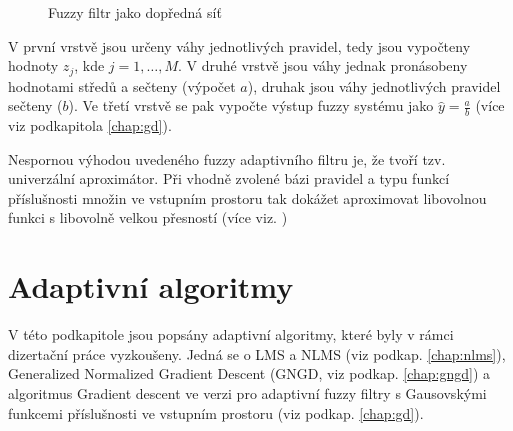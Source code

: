 \begin{figure}[t]
    \caption{Fuzzy filtr jako dopředná síť}
    \label{img:fuzzy_network}
\end{figure}

V první vrstvě jsou určeny váhy jednotlivých pravidel, tedy jsou vypočteny hodnoty $z_j$, kde $j=1,\dots, M$. V druhé vrstvě jsou váhy jednak pronásobeny hodnotami středů a sečteny (výpočet $a$), druhak jsou váhy jednotlivých pravidel sečteny ($b$). Ve třetí vrstvě se pak vypočte výstup fuzzy systému jako $\hat{y}=\frac{a}{b}$ (více viz podkapitola \ref{chap:gd}). 
\par Nespornou výhodou uvedeného fuzzy adaptivního filtru je, že tvoří tzv. univerzální aproximátor. Při vhodně zvolené bázi pravidel a typu funkcí příslušnosti množin ve vstupním prostoru tak dokážet aproximovat libovolnou funkci s libovolně velkou přesností (více viz. \cite{latexcompanion})


\section{Adaptivní algoritmy}\label{chap:aa}
V této podkapitole jsou popsány adaptivní algoritmy, které byly v rámci dizertační práce vyzkoušeny. Jedná se o LMS a NLMS (viz podkap. \ref{chap:nlms}), Generalized Normalized Gradient Descent (GNGD, viz podkap. \ref{chap:gngd}) a algoritmus Gradient descent ve verzi pro adaptivní fuzzy filtry s Gausovskými funkcemi příslušnosti ve vstupním prostoru (viz podkap. \ref{chap:gd}).
